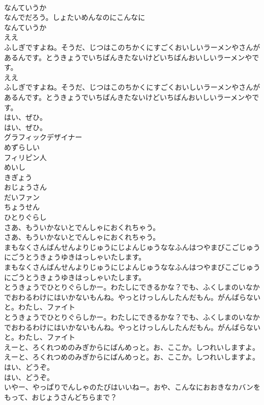 \documentclass[8pt]{extreport}
\begin{document}
\begin{CJK}{UTF8}{min}
\\	なんていうか
\\	なんでだろう。しょたいめんなのにこんなに
\\	なんていうか
\\	ええ
\\	ふしぎですよね。そうだ、じつはこのちかくにすごくおいしいラーメンやさんがあるんです。とうきょうでいちばんきたないけどいちばんおいしいラーメンやです。
\\	ええ
\\	ふしぎですよね。そうだ、じつはこのちかくにすごくおいしいラーメンやさんがあるんです。とうきょうでいちばんきたないけどいちばんおいしいラーメンやです。
\\	はい、ぜひ。
\\	はい、ぜひ。
\\	グラフィックデザイナー
\\	めずらしい
\\	フィリピン人
\\	めいし
\\	きぎょう
\\	おじょうさん
\\	だいファン
\\	ちょうせん
\\	ひとりぐらし
\\	さあ、もういかないとでんしゃにおくれちゃう。
\\	さあ、もういかないとでんしゃにおくれちゃう。
\\	まもなくさんばんせんよりじゅうにじよんじゅうななふんはつやまびこごじゅうにごうとうきょうゆきはっしゃいたします。
\\	まもなくさんばんせんよりじゅうにじよんじゅうななふんはつやまびこごじゅうにごうとうきょうゆきはっしゃいたします。
\\	とうきょうでひとりぐらしかー。わたしにできるかな？でも、ふくしまのいなかでおわるわけにはいかないもんね。やっとけっしんしたんだもん。がんばらないと。わたし、ファイト
\\	とうきょうでひとりぐらしかー。わたしにできるかな？でも、ふくしまのいなかでおわるわけにはいかないもんね。やっとけっしんしたんだもん。がんばらないと。わたし、ファイト
\\	えーと、ろくれつめのみぎからにばんめっと。お、ここか。しつれいしますよ。
\\	えーと、ろくれつめのみぎからにばんめっと。お、ここか。しつれいしますよ。
\\	はい、どうぞ。
\\	はい、どうぞ。
\\	いやー、やっぱりでんしゃのたびはいいねー。おや、こんなにおおきなカバンをもって、おじょうさんどちらまで？

\end{CJK}
\end{document}
